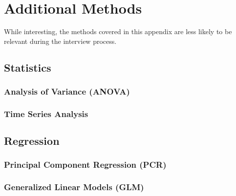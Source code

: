 \chapter{Additional Methods}
\label{additional}

While interesting, the methods covered in this appendix are less likely
to be relevant during the interview process.

\section{Statistics}
\label{additional:stats}

\subsection{Analysis of Variance (ANOVA)}
\label{additional:stats:ANOVA}

\subsection{Time Series Analysis}
\label{additional:stats:time_series_ana}

\section{Regression}
\label{additional:Regression}

\subsection{Principal Component Regression (PCR)}
\label{additional:Regression:PCR}

\subsection{Generalized Linear Models (GLM)}
\label{additional:Regression:GLM}

